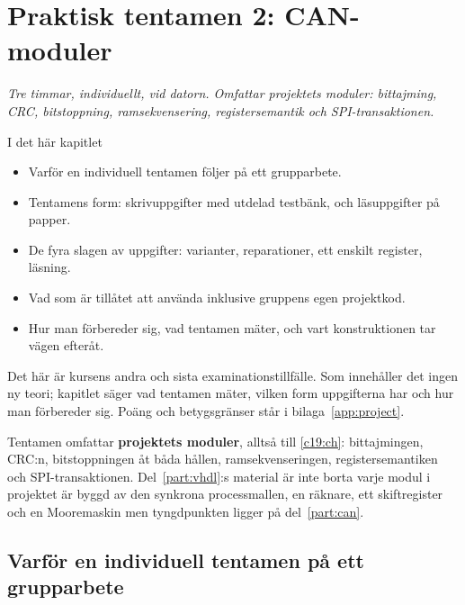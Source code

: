 
\chapter{Praktisk tentamen 2: CAN-moduler}
\label{c20:ch}

{\large\itshape Tre timmar, individuellt, vid datorn. Omfattar projektets moduler: bittajming, CRC,
bitstoppning, ramsekvensering, registersemantik och SPI-transaktionen.\par}

\begin{chapterbox}{I det här kapitlet}
\begin{itemize}
  \item Varför en individuell tentamen följer på ett grupparbete.
  \item Tentamens form: skrivuppgifter med utdelad testbänk, och läsuppgifter på papper.
  \item De fyra slagen av uppgifter: varianter, reparationer, ett enskilt register, läsning.
  \item Vad som är tillåtet att använda \textemdash{} inklusive gruppens egen projektkod.
  \item Hur man förbereder sig, vad tentamen mäter, och vart konstruktionen tar vägen efteråt.
\end{itemize}
\end{chapterbox}

Det här är kursens andra och sista examinationstillfälle. Som  innehåller det ingen ny
teori; kapitlet säger vad tentamen mäter, vilken form uppgifterna har och hur man förbereder sig.
Poäng och betygsgränser står i bilaga~\ref{app:project}.

Tentamen omfattar \textbf{projektets moduler}, alltså  till \ref{c19:ch}:
bittajmingen, CRC:n, bitstoppningen åt båda hållen, ramsekvenseringen, registersemantiken och
SPI-transaktionen. Del~\ref{part:vhdl}:s material är inte borta \textemdash{} varje modul i
projektet är byggd av den synkrona processmallen, en räknare, ett skiftregister och en Mooremaskin
\textemdash{} men tyngdpunkten ligger på del~\ref{part:can}.

\section{Varför en individuell tentamen på ett grupparbete}
\label{c20:sec:why}

